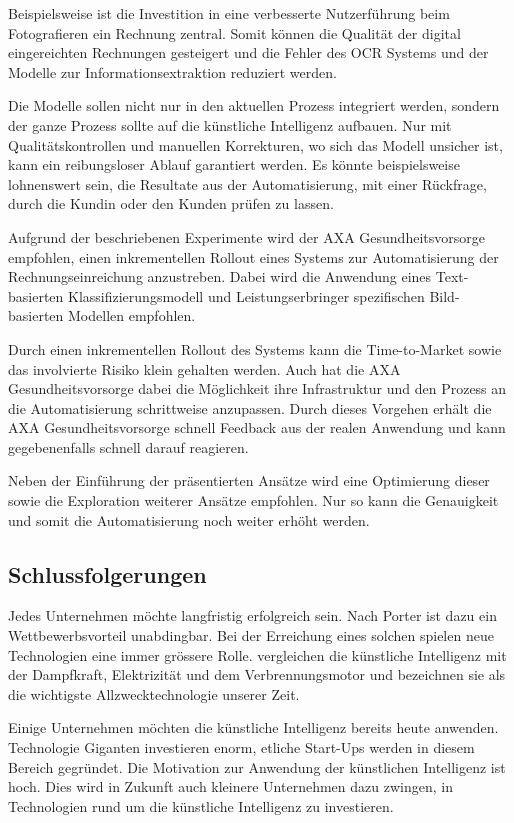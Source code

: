 Beispielsweise ist die Investition in eine verbesserte Nutzerführung beim Fotografieren ein Rechnung zentral. Somit können die Qualität der digital eingereichten Rechnungen gesteigert und die Fehler des OCR Systems und der Modelle zur Informationsextraktion reduziert werden.

Die Modelle sollen nicht nur in den aktuellen Prozess integriert werden, sondern der ganze Prozess sollte auf die künstliche Intelligenz aufbauen. Nur mit Qualitätskontrollen und manuellen Korrekturen, wo sich das Modell unsicher ist, kann ein reibungsloser Ablauf garantiert werden. Es könnte beispielsweise lohnenswert sein, die Resultate aus der Automatisierung, mit einer Rückfrage, durch die Kundin oder den Kunden prüfen zu lassen.

Aufgrund der beschriebenen Experimente wird der AXA Gesundheitsvorsorge empfohlen, einen inkrementellen Rollout eines Systems zur Automatisierung der Rechnungseinreichung anzustreben. Dabei wird die Anwendung eines Text-basierten Klassifizierungsmodell und Leistungserbringer spezifischen Bild-basierten Modellen empfohlen.

Durch einen inkrementellen Rollout des Systems kann die Time-to-Market sowie das involvierte Risiko klein gehalten werden. Auch hat die AXA Gesundheitsvorsorge dabei die Möglichkeit ihre Infrastruktur und den Prozess an die Automatisierung schrittweise anzupassen. Durch dieses Vorgehen erhält die AXA Gesundheitsvorsorge schnell Feedback aus der realen Anwendung und kann gegebenenfalls schnell darauf reagieren.

Neben der Einführung der präsentierten Ansätze wird eine Optimierung dieser sowie die Exploration weiterer Ansätze empfohlen. Nur so kann die Genauigkeit und somit die Automatisierung noch weiter erhöht werden.

\subsection{Schlussfolgerungen}

Jedes Unternehmen möchte langfristig erfolgreich sein. Nach Porter ist dazu ein Wettbewerbsvorteil unabdingbar. Bei der Erreichung eines solchen spielen neue Technologien eine immer grössere Rolle. \textcite{McAfee} vergleichen die künstliche Intelligenz mit der Dampfkraft, Elektrizität und dem Verbrennungsmotor und bezeichnen sie als die wichtigste Allzwecktechnologie unserer Zeit.

Einige Unternehmen möchten die künstliche Intelligenz bereits heute anwenden. Technologie Giganten investieren enorm, etliche Start-Ups werden in diesem Bereich gegründet. Die Motivation zur Anwendung der künstlichen Intelligenz ist hoch. Dies wird in Zukunft auch kleinere Unternehmen dazu zwingen, in Technologien rund um die künstliche Intelligenz zu investieren.


